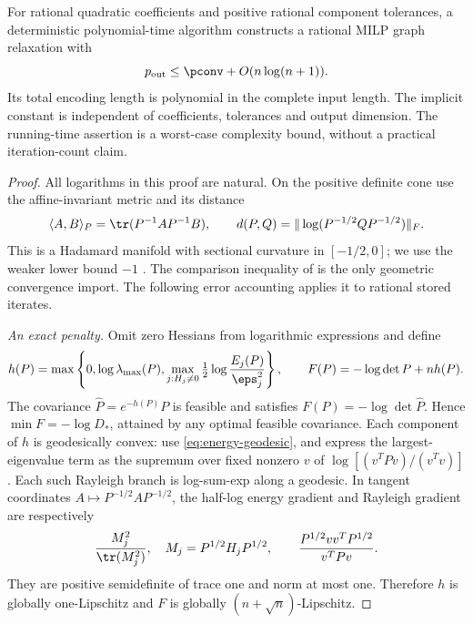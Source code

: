 \begin{theorem}\label{thm:rational-finite}
For rational quadratic coefficients and positive rational component
tolerances, a deterministic polynomial-time algorithm constructs a rational
MILP graph relaxation with
\begin{equation}\label{eq:rational-finite-count}
 p_{\rm out}\le\pconv+O(n\log(n+1)).
\end{equation}
Its total encoding length is polynomial in the complete input length.
The implicit constant is independent of coefficients, tolerances and
output dimension. The running-time assertion is a worst-case complexity
bound, without a practical iteration-count claim.
\end{theorem}
\begin{proof}
All logarithms in this proof are natural. On the positive definite cone
use the affine-invariant metric and its distance
\[
 \langle A,B\rangle_P=\tr(P^{-1}AP^{-1}B),\qquad
 d(P,Q)=\|\log(P^{-1/2}QP^{-1/2})\|_F.
\]
This is a Hadamard manifold with sectional curvature in $[-1/2,0]$;
we use the weaker lower bound $-1$ \citep[Proposition I.1]{criscitiello2021}.
The comparison inequality of \citet[Corollary 8]{zhang2016} is the only
geometric convergence import. The following error accounting applies
it to rational stored iterates.

\emph{An exact penalty.} Omit zero Hessians from logarithmic expressions
and define
\begin{equation}\label{eq:exact-covariance-penalty}
 h(P)=\max\left\{0,\log\lambda_{\max}(P),
          \max_{j:H_j\ne0}\tfrac12\log\frac{E_j(P)}{\eps_j^2}\right\},
 \qquad F(P)=-\log\det P+nh(P).
\end{equation}
The covariance $\widehat P=e^{-h(P)}P$ is feasible and satisfies
$F(P)=-\log\det\widehat P$. Hence $\min F=-\log D_*$, attained by any
optimal feasible covariance. Each component of $h$ is geodesically convex:
use \eqref{eq:energy-geodesic}, and express the largest-eigenvalue term
as the supremum over fixed nonzero $v$ of
$\log[(v^TPv)/(v^Tv)]$. Each such Rayleigh branch is log-sum-exp along a
geodesic. In tangent coordinates $A\mapsto P^{-1/2}AP^{-1/2}$, the
half-log energy gradient and Rayleigh gradient are respectively
\begin{equation}\label{eq:energy-gradients}
 \frac{M_j^2}{\tr(M_j^2)},\quad M_j=P^{1/2}H_jP^{1/2},
 \qquad \frac{P^{1/2}vv^TP^{1/2}}{v^TPv}.
\end{equation}
They are positive semidefinite of trace one and norm at most one.
Therefore $h$ is globally one-Lipschitz and $F$ is globally
$(n+\sqrt n)$-Lipschitz.


\end{proof}

